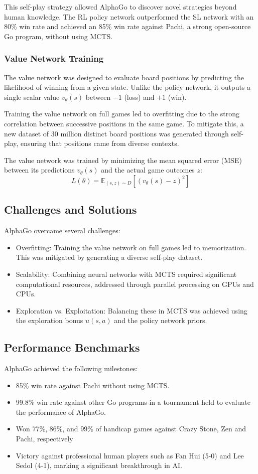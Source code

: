 This self-play strategy allowed AlphaGo to discover novel strategies beyond human knowledge. The RL policy network outperformed the SL network with an 80\% win rate and achieved an 85\% win rate against Pachi, a strong open-source Go program, without using MCTS.

\subsubsection{Value Network Training}
The value network was designed to evaluate board positions by predicting the likelihood of winning from a given state. Unlike the policy network, it outputs a single scalar value \( v_\theta(s) \) between \(-1\) (loss) and \(+1\) (win).

Training the value network on full games led to overfitting due to the strong correlation between successive positions in the same game. To mitigate this, a new dataset of 30 million distinct board positions was generated through self-play, ensuring that positions came from diverse contexts.

The value network was trained by minimizing the mean squared error (MSE) between its predictions \( v_\theta(s) \) and the actual game outcomes \( z \):
\[
L(\theta) = \mathbb{E}_{(s, z) \sim D} \left[ (v_\theta(s) - z)^2 \right]
\]
\subsection{Challenges and Solutions}
AlphaGo overcame several challenges:
\begin{itemize}
    \item Overfitting: Training the value network on full games led to memorization. This was mitigated by generating a diverse self-play dataset.
    \item Scalability: Combining neural networks with MCTS required significant computational resources, addressed through parallel processing on GPUs and CPUs.
    \item Exploration vs. Exploitation: Balancing these in MCTS was achieved using the exploration bonus \( u(s, a) \) and the policy network priors.
\end{itemize}

\subsection{Performance Benchmarks}
AlphaGo achieved the following milestones:
\begin{itemize}
    \item 85\% win rate against Pachi without using MCTS.
    \item 99.8\% win rate against other Go programs in a tournament held to evaluate the performance of AlphaGo.
    \item Won 77\%, 86\%, and 99\% of handicap games against Crazy Stone, Zen and Pachi, respectively
    \item Victory against professional human players such as Fan Hui (5-0) and Lee Sedol (4-1), marking a significant breakthrough in AI.
\end{itemize}


